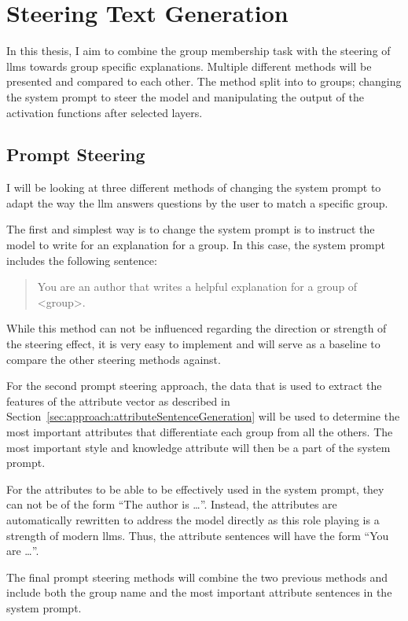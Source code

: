 \section{Steering Text Generation}
In this thesis, I aim to combine the group membership task with the steering of \acp{llm} towards group specific explanations. Multiple different methods will be presented and compared to each other. The method split into to groups; changing the system prompt to steer the model and manipulating the output of the activation functions after selected layers.

\subsection{Prompt Steering}
\label{sec:approach:steering:prompt}
I will be looking at three different methods of changing the system prompt to adapt the way the \ac{llm} answers questions by the user to match a specific group.

The first and simplest way is to change the system prompt is to instruct the model to write for an explanation for a group. In this case, the system prompt includes the following sentence:
\begin{quote}
  You are an author that writes a helpful explanation for a group of <group>.
\end{quote}

While this method can not be influenced regarding the direction or strength of the steering effect, it is very easy to implement and will serve as a baseline to compare the other steering methods against.

For the second prompt steering approach, the data that is used to extract the features of the attribute vector as described in Section~\ref{sec:approach:attributeSentenceGeneration} will be used to determine the most important attributes that differentiate each group from all the others. The most important style and knowledge attribute will then be a part of the system prompt.

For the attributes to be able to be effectively used in the system prompt, they can not be of the form \enquote{The author is \ldots}. Instead, the attributes are automatically rewritten to address the model directly as this role playing is a strength of modern \aclp{llm}. %
Thus, the attribute sentences will have the form \enquote{You are \ldots}.

The final prompt steering methods will combine the two previous methods and include both the group name and the most important attribute sentences in the system prompt.

